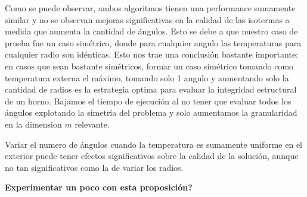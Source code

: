 Como se puede observar, ambos algoritmos tienen una performance sumamente similar y no se observan mejoras significativas en la calidad de las isotermas a medida que aumenta la cantidad de ángulos. Esto se debe a que nuestro caso de prueba fue un caso simétrico, donde para cualquier angulo las temperaturas para cualquier radio son idénticas. Esto nos trae una conclusión bastante importante: en casos que sean bastante simétricos, formar un caso simétrico tomando como temperatura externa el máximo, tomando solo 1 angulo y aumentando solo la cantidad de radios es la estrategia optima para evaluar la integridad estructural de un horno. Bajamos el tiempo de ejecución al no tener que evaluar todos los ángulos explotando la simetría del problema y solo aumentamos la granularidad en la dimension $m$ relevante.

Variar el numero de ángulos cuando la temperatura es sumamente uniforme en el exterior puede tener efectos significativos sobre la calidad de la solución, aunque no tan significativos como la de variar los radios.

\textbf{Experimentar un poco con esta proposición?}

